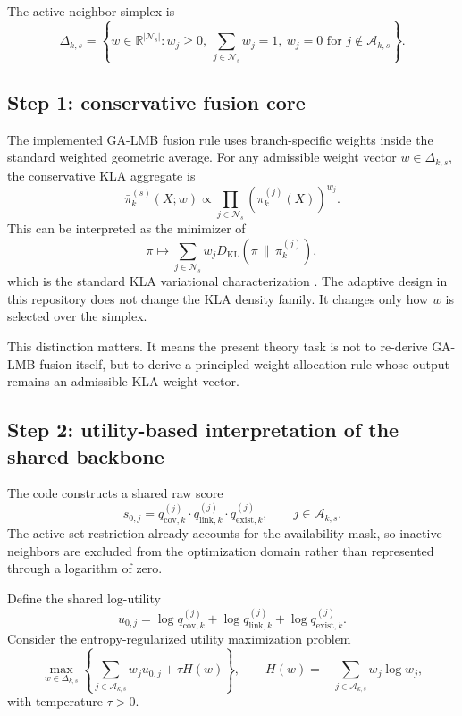 The active-neighbor simplex is
\begin{equation}
\Delta_{k,s} = \left\{ w \in \mathbb{R}^{|\mathcal{N}_s|} : w_j \ge 0,\ \sum_{j \in \mathcal{N}_s} w_j = 1,\ w_j = 0 \text{ for } j \notin \mathcal{A}_{k,s} \right\}.
\end{equation}

\subsection*{Step 1: conservative fusion core}

The implemented GA-LMB fusion rule uses branch-specific weights inside the standard weighted geometric average. For any admissible weight vector $w \in \Delta_{k,s}$, the conservative KLA aggregate is
\begin{equation}
\bar{\pi}_{k}^{(s)}(X;w) \propto \prod_{j \in \mathcal{N}_s} \left(\pi_k^{(j)}(X)\right)^{w_j}.
\end{equation}
This can be interpreted as the minimizer of
\begin{equation}
\pi \mapsto \sum_{j \in \mathcal{N}_s} w_j D_{\mathrm{KL}}\!\left(\pi \,\|\, \pi_k^{(j)}\right),
\end{equation}
which is the standard KLA variational characterization \citep{Battistelli2014KLA}. The adaptive design in this repository does not change the KLA density family. It changes only how $w$ is selected over the simplex.

This distinction matters. It means the present theory task is not to re-derive GA-LMB fusion itself, but to derive a principled weight-allocation rule whose output remains an admissible KLA weight vector.

\subsection*{Step 2: utility-based interpretation of the shared backbone}

The code constructs a shared raw score
\begin{equation}
s_{0,j}
=
q_{\mathrm{cov},k}^{(j)}
\cdot
q_{\mathrm{link},k}^{(j)}
\cdot
q_{\mathrm{exist},k}^{(j)},
\qquad j \in \mathcal{A}_{k,s}.
\end{equation}
The active-set restriction already accounts for the availability mask, so inactive neighbors are excluded from the optimization domain rather than represented through a logarithm of zero.

Define the shared log-utility
\begin{equation}
u_{0,j} = \log q_{\mathrm{cov},k}^{(j)} + \log q_{\mathrm{link},k}^{(j)} + \log q_{\mathrm{exist},k}^{(j)}.
\end{equation}
Consider the entropy-regularized utility maximization problem
\begin{equation}
\max_{w \in \Delta_{k,s}}
\left\{
\sum_{j \in \mathcal{A}_{k,s}} w_j u_{0,j}
+
\tau H(w)
\right\},
\qquad
H(w) = - \sum_{j \in \mathcal{A}_{k,s}} w_j \log w_j,
\label{eq:shared-utility-problem}
\end{equation}
with temperature $\tau > 0$.

